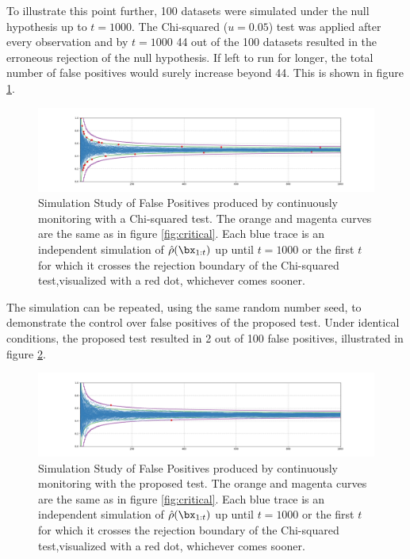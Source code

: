 \documentclass[11pt]{article}
\begin{document}
  To illustrate this point further, 100 datasets were simulated under the null hypothesis up to $t=1000$.
The Chi-squared ($u=0.05$) test was applied after every observation and by $t=1000$ 44 out of the 100 datasets resulted in the erroneous rejection of the null hypothesis.
If left to run for longer, the total number of false positives would surely increase beyond 44.
This is shown in figure \ref{fig:chi_fp}.
  \begin{figure}[h!]
  \centering
  \includegraphics[scale=0.35]{images/chi_fp.png}
  \caption{Simulation Study of False Positives produced by continuously monitoring with a Chi-squared test.
The orange and magenta curves are the same as in figure \ref{fig:critical}.
Each blue trace is an independent simulation of $\hat{\rho}(\bx_{1:t})$ up until $t=1000$ or the first $t$ for which it crosses the rejection boundary of the Chi-squared test,visualized with a red dot, whichever comes sooner.
}
    \label{fig:chi_fp}
  \end{figure}
  The simulation can be repeated, using the same random number seed, to demonstrate the control over false positives of the proposed test.
Under identical conditions, the proposed test resulted in 2 out of 100 false positives, illustrated in figure \ref{fig:ssrm_fp}.
    \begin{figure}[H]
  \centering
  \includegraphics[scale=0.35]{images/ssrm_fp.png}
  \caption{Simulation Study of False Positives produced by continuously monitoring with the proposed test.
The orange and magenta curves are the same as in figure \ref{fig:critical}.
Each blue trace is an independent simulation of $\hat{\rho}(\bx_{1:t})$ up until $t=1000$ or the first $t$ for which it crosses the rejection boundary of the Chi-squared test,visualized with a red dot, whichever comes sooner.
}
    \label{fig:ssrm_fp}
  \end{figure}
\end{document}
